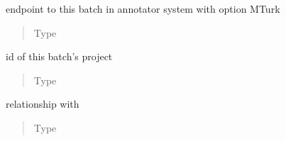 \documentclass[a4paper,12pt,english]{sphinxmanual}
\begin{document}
\begin{fulllineitems}
\begin{fulllineitems}
\begin{quote}
\begin{description}
\end{description}\end{quote}

\end{fulllineitems}


\begin{fulllineitems}
\label{\detokenize{project_rst/models:project.models.Batch.hit_id}}
endpoint to this batch
in annotator system with option MTurk
\begin{quote}\begin{description}
\item[{Type}] \leavevmode
{}

\end{description}\end{quote}

\end{fulllineitems}


\begin{fulllineitems}
\label{\detokenize{project_rst/models:project.models.Batch.project_id}}
id of this batch’s project
\begin{quote}\begin{description}
\item[{Type}] \leavevmode
{}

\end{description}\end{quote}

\end{fulllineitems}


\begin{fulllineitems}
\label{\detokenize{project_rst/models:project.models.Batch.project}}
relationship with {\hyperref[\detokenize{project_rst/models:project.models.Project}]{}}
\begin{quote}\begin{description}
\item[{Type}] \leavevmode
{}


\end{description}
\end{quote}
\end{fulllineitems}
\end{fulllineitems}
\end{document}
